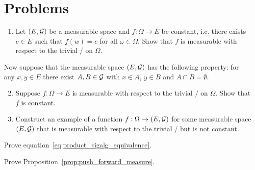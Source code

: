 
\section{Problems}

\begin{problem}
\hfil
\begin{enumerate}[label=(\alph*)]
\item Let $(E, \mathcal G)$ be a measurable space and $f : \Omega \to E$ be constant, i.e. there exists $e \in E$ such that $f(w) = e$ for all $\omega \in \Omega$. Show that $f$ is measurable with respect to the trivial \sigalg/ on $\Omega$.  
\end{enumerate}

Now suppose that the measurable space $(E, \mathcal G)$ has the following property: for any $x,y\in E$ there exist $A, B \in \mathcal G$ with $x \in A$, $y \in B$ and $A \cap B = \emptyset$.

\begin{enumerate}
\setcounter{enumi}{1}
\item Suppose $f : \Omega \to E$ is measurable with respect to the trivial \sigalg/ on $\Omega$. Show that $f$ is constant.
\item Construct an example of a function $f : \Omega \to (E,\mathcal G)$ for some measurable space $(E, \mathcal G)$ that is measurable with respect to the trivial \sigalg/ but is not constant.
\end{enumerate}
\end{problem}

\begin{problem}\label{prb:product_sigalg_equivalence}
Prove equation~\eqref{eq:product_sigalg_equivalence}.
\end{problem}


\begin{problem}\label{prb:push_forward_measure}
Prove Proposition~\ref{prop:push_forward_measure}.
\end{problem}

